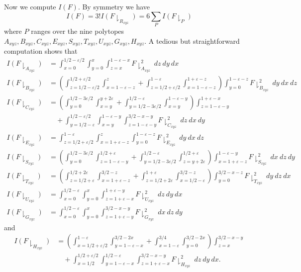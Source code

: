 \documentclass{bmcart}
\theoremstyle{plain}
\theoremstyle{definition}
\newcommand\eps{\varepsilon}
\begin{document}
Now we compute $I(F)$.  By symmetry we have
$$ I(F) = 3! I(F \downharpoonright_{R_{xyz}} ) = 6 \sum_P I( F \downharpoonright_P ) $$
where $P$ ranges over the nine polytopes $A_{xyz}, B_{xyz}, C_{xyz}, E_{xyz}, S_{xyz}, T_{xyz}, U_{xyz}, G_{xyz}, H_{xyz}$.  A tedious but straightforward computation shows that
\begin{align*}
I(F\downharpoonright_{A_{xyz}}) & =\int_{x=0}^{1/2-\eps/2}\int_{y=0}^{x}\int_{z=x}^{1-\eps-x}F\downharpoonright_{A_{xyz}}^2\ dz\ dy\ dx \\
I(F\downharpoonright_{B_{xyz}}) &= \left(\int_{z=1/2-\eps/2}^{1/2+\eps/2}\int_{x=1-\eps-z}^{z} +\int_{z=1/2+\eps/2}^{1-\eps}\int_{x=1-\eps-z}^{1+\eps-z}\right) \int_{y=0}^{1-\eps-z}F\downharpoonright_{B_{xyz}}^2\ dy\ dx\ dz \\
I(F\downharpoonright_{C_{xyz}}) & = \left(\int_{y=0}^{1/2-3\eps/2} \int_{x=y}^{y+2\eps} + \int_{y=1/2-3\eps/2}^{1/2-\eps}\int_{x=y}^{1-\eps-y} \right) \int_{z=1-\eps-y}^{1+\eps-x} \\
&\quad + \int_{y=1/2-\eps}^{1/2-\eps/2}\int_{x=y}^{1-\eps-y}\int_{z=1-\eps-y}^{3/2-x-y} F\downharpoonright_{C_{xyz}}^2\ dz\ dx\ dy \\
I(F\downharpoonright_{E_{xyz}}) & = \int_{z=1/2+\eps/2}^{1-\eps}\int_{x=1+\eps-z}^{z}\int_{y=0}^{1-\eps-z} F\downharpoonright_{E_{xyz}}^2\ dy\ dx\ dz \\
I(F\downharpoonright_{S_{xyz}}) & =  \left(\int_{y=0}^{1/2-3\eps/2}\int_{z=1-\eps-y}^{1/2+\eps} +\int_{y=1/2-3\eps/2}^{1/2-\eps}\int_{z=y+2\eps}^{1/2+\eps} \right)\int_{x=1+\eps-z}^{1-\eps-y} F\downharpoonright_{S_{xyz}}^2\ dx\ dz\ dy \\
I(F\downharpoonright_{T_{xyz}}) &  = \left(\int_{z=1/2+\eps}^{1/2+2\eps}\int_{x=1+\eps-z}^{3/2-z} + \int_{z=1/2+2\eps}^{1+\eps}\int_{x=1/2-\eps}^{3/2-z}\right)\int_{y=0}^{3/2-x-z} F\downharpoonright_{T_{xyz}}^2\ dy\ dz\ dx \\
I(F\downharpoonright_{U_{xyz}}) & = \int_{x=0}^{1/2-\eps}\int_{y=0}^{x}\int_{z=1+\eps-x}^{1+\eps-y} F\downharpoonright_{U_{xyz}}^2\ dz\ dy\ dx\\
I(F\downharpoonright_{G_{xyz}}) & = \int_{x=0}^{1/2-\eps}\int_{y=0}^{x}\int_{z=1+\eps-y}^{3/2-x-y} F\downharpoonright_{G_{xyz}}^2\ dx\ dz\ dy
\end{align*}
and
\begin{align*}
I(F\downharpoonright_{H_{xyz}}) & =\left(\int_{x=1/2+\eps/2}^{1-\eps}\int_{y=1-\eps-x}^{3/2-2x} +\int_{x=1-\eps}^{3/4}\int_{y=0}^{3/2-2x} \right) \int_{z=x}^{3/2-x-y}\\
&\quad + \int_{x=1/2}^{1/2+\eps/2}\int_{y=1-\eps-x}^{1/2-\eps}\int_{z=1+\eps-x}^{3/2-x-y} F\downharpoonright_{H_{xyz}}^2\ dz\ dy\ dx.
\end{align*}
\end{document}
